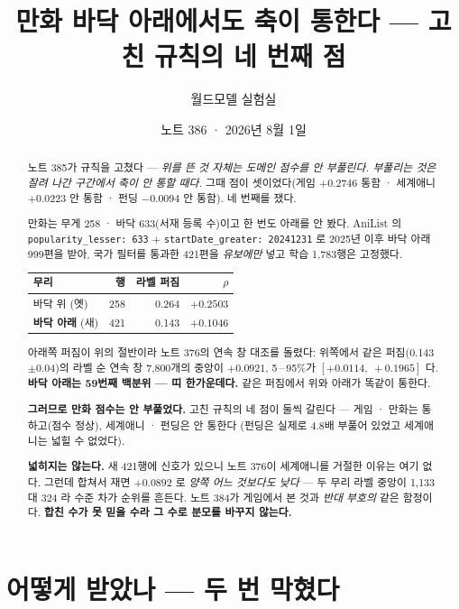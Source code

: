 \documentclass[11pt]{article}
\begin{document}
\title{만화 바닥 아래에서도 축이 통한다 --- 고친 규칙의 네 번째 점}
\author{월드모델 실험실}
\date{노트 386 · 2026년 8월 1일}
\maketitle

\begin{abstract}
노트 385가 규칙을 고쳤다 --- \emph{위를 뜬 것 자체는 도메인 점수를 안
부풀린다. 부풀리는 것은 잘려 나간 구간에서 축이 안 통할 때다.} 그때
점이 셋이었다(게임 $+0.2746$ 통함 · 세계애니 $+0.0223$ 안 통함 · 펀딩
$-0.0094$ 안 통함). 네 번째를 쟀다.

만화는 무게 258 · 바닥 633(서재 등록 수)이고 한 번도 아래를 안 봤다.
AniList 의 \texttt{popularity\_lesser: 633} $+$
\texttt{startDate\_greater: 20241231} 로 2025년 이후 바닥 아래 999편을
받아, 국가 필터를 통과한 421편을 \emph{유보에만} 넣고 학습 1,783행은
고정했다.

\begin{center}
\begin{tabular}{lrrr}
\hline
무리 & 행 & 라벨 퍼짐 & $\rho$ \\
\hline
바닥 위 (옛) & 258 & 0.264 & $+0.2503$ \\
\textbf{바닥 아래} (새) & 421 & 0.143 & $\mathbf{+0.1046}$ \\
\hline
\end{tabular}
\end{center}

아래쪽 퍼짐이 위의 절반이라 노트 376의 연속 창 대조를 돌렸다: 위쪽에서
같은 퍼짐(0.143$\pm$0.04)의 라벨 순 연속 창 7,800개의 중앙이 $+0.0921$,
5\,--\,95\%가 $[+0.0114,\ +0.1965]$ 다. \textbf{바닥 아래는 59번째 백분위
--- 띠 한가운데다.} 같은 퍼짐에서 위와 아래가 똑같이 통한다.

\textbf{그러므로 만화 점수는 안 부풀었다.} 고친 규칙의 네 점이 둘씩
갈린다 --- 게임 · 만화는 통하고(점수 정상), 세계애니 · 펀딩은 안 통한다
(펀딩은 실제로 4.8배 부풀어 있었고 세계애니는 넓힐 수 없었다).

\textbf{넓히지는 않는다.} 새 421행에 신호가 있으니 노트 376이 세계애니를
거절한 이유는 여기 없다. 그런데 합쳐서 재면 $+0.0892$ 로 \emph{양쪽 어느
것보다도 낮다} --- 두 무리 라벨 중앙이 1,133 대 324 라 수준 차가 순위를
흔든다. 노트 384가 게임에서 본 것과 \emph{반대 부호의} 같은 함정이다.
\textbf{합친 수가 못 믿을 수라 그 수로 분모를 바꾸지 않는다.}
\end{abstract}

\section{어떻게 받았나 --- 두 번 막혔다}
\end{document}
